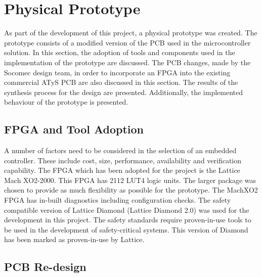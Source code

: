 
\section{Physical Prototype}
As part of the development of this project, a physical prototype was created. The prototype consists of a modified version of the PCB used in the microcontroller solution. In this section, the adoption of tools and components used in the implementation of the prototype are discussed. The PCB changes, made by the Socomec design team, in order to incorporate an FPGA into the existing commercial ATyS PCB are also discussed in this section. The results of the synthesis process for the design are presented. Additionally, the implemented behaviour of the prototype is presented.

\subsection{FPGA and Tool Adoption}

A number of factors need to be considered in the selection of an embedded controller. These include cost, size, performance, availability and verification capability\cite{Gomes}. The FPGA which has been adopted for the project is the Lattice Mach XO2-2000. This FPGA has 2112 LUT4 logic units. The larger package was chosen to provide as much flexibility as possible for the prototype. The MachXO2 FPGA has in-built diagnostics including configuration checks. The safety compatible version of Lattice Diamond (Lattice Diamond 2.0) was used for the development in this project. The safety standards require proven-in-use tools to be used in the development of safety-critical systems. This version of Diamond has been marked as proven-in-use by Lattice.


\subsection{PCB Re-design}

